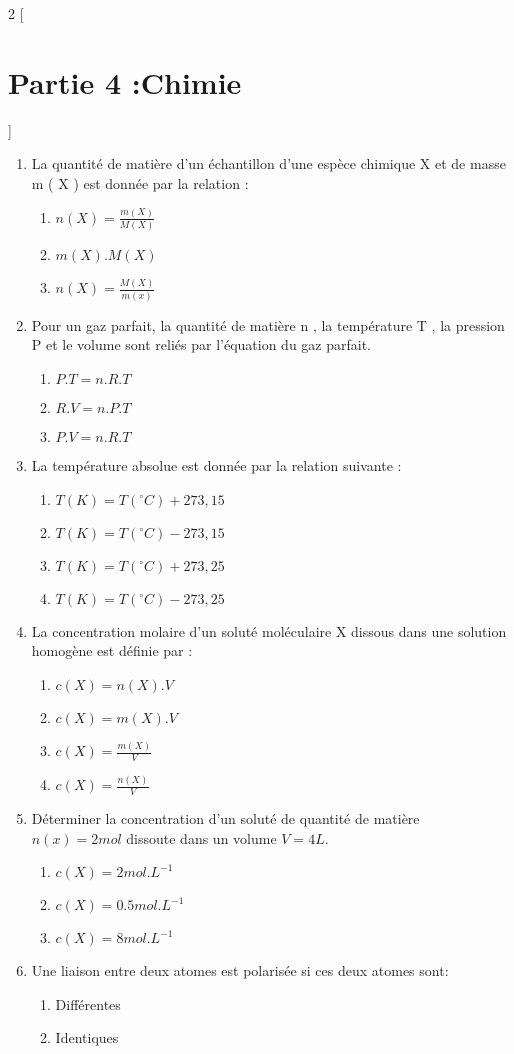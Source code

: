 \documentclass[12pt]{article}
\begin{document}
\begin{multicols}{2}
    [
        \section*{Partie 4 :Chimie}
    ]
	\begin{enumerate}
		\item La quantité de matière d’un échantillon d’une espèce chimique X et de masse m ( X ) est donnée par la relation :
			\begin{enumerate}
				\item $n(X) = \frac{m(X)}{M(X)}$
				\item $m(X).M(X)$
				\item $n(X) = \frac{M(X)}{m(x)}$
			\end{enumerate}
		\item Pour un gaz parfait, la quantité de matière n , la température T , la pression P et le volume sont reliés par
l’équation du gaz parfait.
		\begin{enumerate}
			\item $P.T = n.R.T$
			\item $R.V = n.P.T$
			\item $P.V = n.R.T$
		\end{enumerate}
		\item La température absolue est donnée par la relation suivante :
			\begin{enumerate}
				\item $T(K)=T(^{\circ}C) + 273,15$
				\item $T(K)=T(^{\circ}C) - 273,15$
				\item $T(K)=T(^{\circ}C) + 273,25$
				\item $T(K)=T(^{\circ}C) - 273,25$
			\end{enumerate}
		\item La concentration molaire d’un soluté moléculaire X dissous dans une solution homogène est définie par :
			\begin{enumerate}
				\item $c(X) = n(X).V$
				\item $c(X) = m(X).V$
				\item $c(X) = \frac{m(X)}{V}$
				\item $c(X) = \frac{n(X)}{V}$
			\end{enumerate}
		\item Déterminer la concentration d’un soluté de quantité de matière $n ( x ) = 2mol$ dissoute dans un volume $V = 4L$.
			\begin{enumerate}
				\item $c(X) = 2 mol.L^{-1}$
				\item $c(X) = 0.5 mol.L^{-1}$
				\item $c(X) = 8 mol.L^{-1}$
				\end{enumerate}
			\item Une liaison entre deux atomes est polarisée si ces deux atomes sont: 
				\begin{enumerate}
					\item Différentes \item Identiques


\end{enumerate}
\end{enumerate}
\end{multicols}
\end{document}
